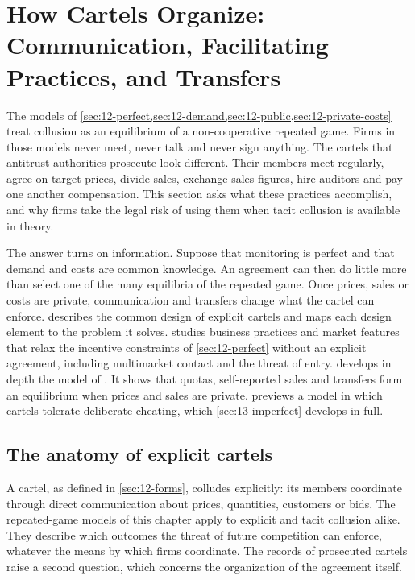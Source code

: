 \section{How Cartels Organize: Communication, Facilitating Practices, and Transfers}\label{sec:12-cartels}

The models of \cref{sec:12-perfect,sec:12-demand,sec:12-public,sec:12-private-costs} treat collusion as an
equilibrium of a non-cooperative repeated game. Firms in those models never meet, never talk and never sign
anything. The cartels that antitrust authorities prosecute look different. Their members meet regularly, agree on
target prices, divide sales, exchange sales figures, hire auditors and pay one another compensation. This section
asks what these practices accomplish, and why firms take the legal risk of using them when tacit collusion is
available in theory.

The answer turns on information. Suppose that monitoring is perfect and that demand and costs are common
knowledge. An agreement can then do little more than select one of the many equilibria of the repeated game.
Once prices, sales or costs are private, communication and transfers change what the cartel can enforce.
 describes the common design of explicit cartels and maps each design element to the problem
it solves.  studies business practices and market features that relax the incentive
constraints of \cref{sec:12-perfect} without an explicit agreement, including multimarket contact and the threat of
entry.  develops in depth the model
of \citet{HarringtonSkrzypacz2011}. It shows that quotas, self-reported sales and transfers form an equilibrium
when prices and sales are private.  previews a model in which cartels tolerate deliberate
cheating, which \cref{sec:13-imperfect} develops in full.

\subsection{The anatomy of explicit cartels}\label{sec:12-anatomy}

A cartel, as defined in \cref{sec:12-forms}, colludes explicitly: its members coordinate through direct
communication about prices, quantities, customers or bids. The repeated-game models of this chapter apply to
explicit and tacit collusion alike. They describe which outcomes the threat of future competition can enforce,
whatever the means by which firms coordinate. The records of prosecuted cartels raise a second question, which
concerns the organization of the agreement itself.

